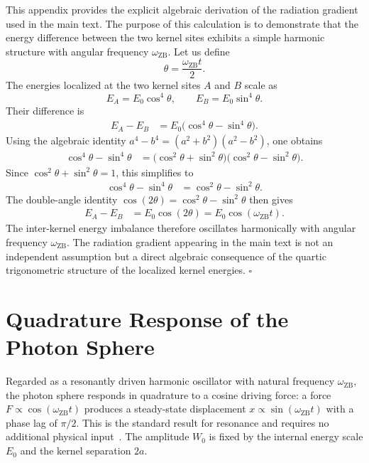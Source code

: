 \documentclass[%
 reprint, amsmath,amssymb, aps, prb, ]{revtex4-2}
\numberwithin{equation}{section}
\newcommand{\omZB}{\omega_{\text{ZB}}}
\begin{document}
This appendix provides the explicit algebraic derivation of the radiation gradient used in the main text. The purpose of this calculation is to demonstrate that the energy difference between the two kernel sites exhibits a simple harmonic structure with angular frequency $\omZB$. Let us define
\begin{equation}
\theta = \frac{\omZB t}{2}.
\end{equation}
The energies localized at the two kernel sites $A$ and $B$ scale as
\begin{equation}
E_A = E_0 \cos^4\theta, \qquad E_B = E_0 \sin^4\theta.
\end{equation}
Their difference is
\begin{align}
E_A - E_B
&= E_0\bigl(\cos^4\theta - \sin^4\theta\bigr).
\end{align}
Using the algebraic identity $a^4 - b^4 = (a^2 + b^2)(a^2 - b^2)$, one obtains
\begin{align}
\cos^4\theta - \sin^4\theta
&= \bigl(\cos^2\theta + \sin^2\theta\bigr)\bigl(\cos^2\theta - \sin^2\theta\bigr).
\end{align}
Since $\cos^2\theta + \sin^2\theta = 1$, this simplifies to
\begin{align}
\cos^4\theta - \sin^4\theta
&= \cos^2\theta - \sin^2\theta.
\end{align}
The double-angle identity $\cos(2\theta) = \cos^2\theta - \sin^2\theta$ then gives
\begin{align}
E_A - E_B
&= E_0\cos(2\theta)
= E_0\cos(\omZB t).
\end{align}
The inter-kernel energy imbalance therefore oscillates harmonically with angular frequency $\omZB$. The radiation gradient appearing in the main text is not an independent assumption but a direct algebraic consequence of the quartic trigonometric structure of the localized kernel energies. $\square$

\section{Quadrature Response of the Photon Sphere}
\label{app:response}

Regarded as a resonantly driven harmonic oscillator with natural frequency $\omZB$, the photon sphere responds in quadrature to a cosine driving force: a force $F\propto\cos(\omZB t)$ produces a steady-state displacement $x\propto\sin(\omZB t)$ with a phase lag of $\pi/2$. This is the standard result for resonance and requires no additional physical input~\cite{Jackson1998}. The amplitude $W_0$ is fixed by the internal energy scale $E_0$ and the kernel separation $2a$.
\end{document}
